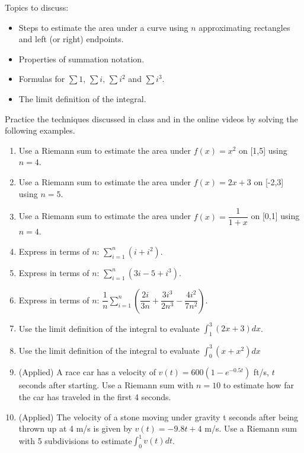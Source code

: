 \documentclass[10pt]{book}
\theoremstyle{definition}
\theoremstyle{remark}
\begin{document}
\begin{large}
\noindent
Topics to discuss:
\begin{itemize}
\item Steps to estimate the area under a curve using $n$ approximating rectangles and left (or right) endpoints. 
\item Properties of summation notation. 
\item Formulas for $\sum 1$, $\sum i$, $\sum i^{2}$ and $\sum i^{3}$.
\item The limit definition of the integral. 
\end{itemize}
\newpage

\noindent
Practice the techniques discussed in class and in the online videos by solving the following examples. 
\begin{enumerate}
\item Use a Riemann sum to estimate the area under $f(x) = x^2$ on [1,5] using $n = 4$.\vfil\vfil
\item Use a Riemann sum to estimate the area under $f(x) = 2x+3$ on [-2,3] using $n=5$.\vfil\vfil
\item Use a Riemann sum to estimate the area under $f(x) = \dfrac{1}{1+x}$ on [0,1] using $n=4$.\vfil
\newpage

\item Express in terms of $n$: $\sum_{i=1}^{n}(i + i^{2})$.\vfil\vfil
\item Express in terms of $n$: $\sum_{i=1}^{n}(3i - 5 + i^{3})$.\vfil\vfil
\item Express in terms of $n$: $\dfrac{1}{n} \sum_{i=1}^{n} \left( \dfrac{2i}{3n} + \dfrac{3i^{3}}{2n^{3}} - \dfrac{4i^{2}}{7n^{2}} \right)$.\vfil
\newpage

\item Use the limit definition of the integral to evaluate $\displaystyle \int_{1}^{3}  (2x+3)dx$.\vfil\vfil
\item Use the limit definition of the integral to evaluate $\displaystyle \int_{0}^{3} \left(x + x^2\right) dx$\vfil
\newpage

\item (Applied) A race car has a velocity of $v(t) = 600(1 - e^{-0.5t})$ ft/s, $t$ seconds after starting. Use a Riemann sum with $n = 10$ to estimate how far the car has traveled in the first 4 seconds.\vfil\vfil
\item (Applied) The velocity of a stone moving under gravity t seconds after being thrown up at 4 m/s is given by $v(t) = -9.8t + 4$ m/s. Use a Riemann sum with 5 subdivisions to estimate$\int_{0}^1 v(t) dt$. \vfil
\end{enumerate}
\end{large}
\newpage
\end{document}
